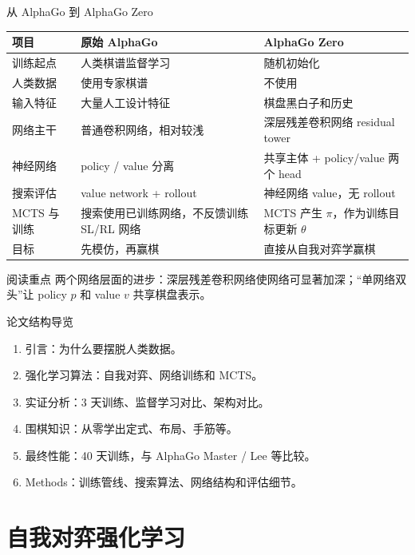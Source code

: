 \documentclass[UTF8,aspectratio=169,10pt]{ctexbeamer}
\begin{document}
\begin{frame}{从 AlphaGo 到 AlphaGo Zero}
  \scriptsize
  \begin{center}
    \begin{tabular}{@{}p{}p{}p{}@{}}
      \toprule
      项目 & 原始 AlphaGo & AlphaGo Zero \\
      \midrule
      训练起点 & 人类棋谱监督学习 & 随机初始化 \\
      人类数据 & 使用专家棋谱 & 不使用 \\
      输入特征 & 大量人工设计特征 & 棋盘黑白子和历史 \\
      网络主干 & 普通卷积网络，相对较浅 & 深层残差卷积网络 residual tower \\
      神经网络 & policy / value 分离 & 共享主体 + policy/value 两个 head \\
      搜索评估 & value network + rollout & 神经网络 value，无 rollout \\
      MCTS 与训练 & 搜索使用已训练网络，不反馈训练 SL/RL 网络 & MCTS 产生 $\pi$，作为训练目标更新 $\theta$ \\
      目标 & 先模仿，再赢棋 & 直接从自我对弈学赢棋 \\
      \bottomrule
    \end{tabular}
  \end{center}

  \begin{alertblock}{阅读重点}
    两个网络层面的进步：深层残差卷积网络使网络可显著加深；“单网络双头”让 policy $p$ 和 value $v$ 共享棋盘表示。
  \end{alertblock}
\end{frame}

\begin{frame}{论文结构导览}
  \begin{enumerate}
    \item 引言：为什么要摆脱人类数据。
    \item 强化学习算法：自我对弈、网络训练和 MCTS。
    \item 实证分析：3 天训练、监督学习对比、架构对比。
    \item 围棋知识：从零学出定式、布局、手筋等。
    \item 最终性能：40 天训练，与 AlphaGo Master / Lee 等比较。
    \item Methods：训练管线、搜索算法、网络结构和评估细节。
  \end{enumerate}
\end{frame}

\section{自我对弈强化学习}
\end{document}
